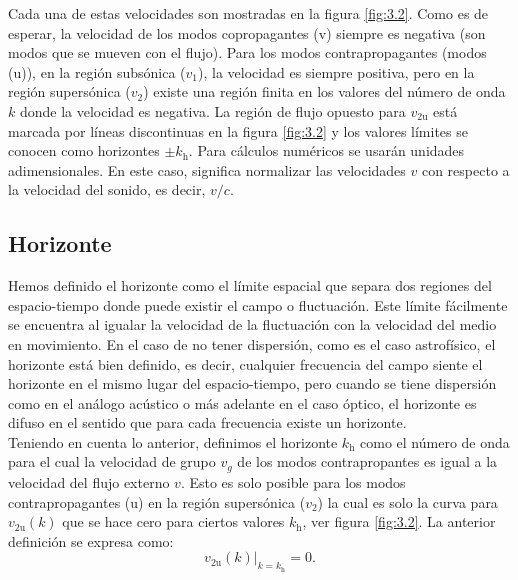 Cada una de estas velocidades son mostradas en la figura \ref{fig:3.2}. Como es de esperar, la velocidad de los modos copropagantes (v) siempre es negativa (son modos que se mueven con el flujo). Para los modos contrapropagantes (modos (u)), en la regi\'{o}n subs\'{o}nica ($v_1$), la velocidad es siempre positiva, pero en la regi\'{o}n supers\'{o}nica ($v_2$) existe una regi\'{o}n finita en los valores del n\'{u}mero de onda $k$ donde la velocidad es negativa. La regi\'{o}n de flujo opuesto para $v_{2\text{u}}$ está marcada por líneas discontinuas en la figura \ref{fig:3.2} y los valores límites se conocen como horizontes $\pm k_{\text{h}}$. Para cálculos numéricos se usar\'{a}n unidades adimensionales. En este caso, significa normalizar las velocidades $v$ con respecto a la velocidad del sonido, es decir, $v / c$.
\subsection{Horizonte}\label{Horizonte Acustico}

Hemos definido el horizonte como el l\'{i}mite espacial que separa dos regiones del espacio-tiempo donde puede existir el campo o fluctuaci\'{o}n. Este l\'{i}mite f\'{a}cilmente se encuentra al igualar la velocidad de la fluctuaci\'{o}n con la velocidad del medio en movimiento. En el caso de no tener dispersi\'{o}n, como es el caso astrof\'{i}sico, el horizonte est\'{a} bien definido, es decir, cualquier frecuencia del campo siente el horizonte en el mismo lugar del espacio-tiempo, pero cuando se tiene dispersi\'{o}n como en el an\'{a}logo ac\'{u}stico o m\'{a}s adelante en el caso \'{o}ptico, el horizonte es difuso en el sentido que para cada frecuencia existe un horizonte.\\

Teniendo en cuenta lo anterior, definimos el horizonte $k_\text{h}$ como el n\'{u}mero de onda para el cual la velocidad de grupo  $v_g$ de los modos contrapropantes es igual a la velocidad del flujo externo $v$. Esto es solo posible para los modos contrapropagantes (u) en la regi\'{o}n supers\'{o}nica ($v_2$) la cual es solo la curva para $v_{2\text{u}}(k)$ que se hace cero para ciertos valores $k_{\text{h}}$, ver figura \ref{fig:3.2}. La anterior definici\'{o}n se expresa como:
\begin{equation}
v_{\text{2u}}(k)|_{k=k_{\text{h}}}=0.
\end{equation}


